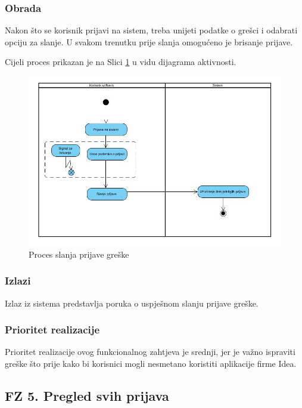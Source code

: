 \documentclass[12pt,a4paper]{article}
\begin{document}
\subsubsection{Obrada}

Nakon što se korisnik prijavi na sistem, treba unijeti podatke o grešci i odabrati opciju za slanje. U svakom trenutku prije slanja omogućeno je brisanje prijave.

Cijeli proces prikazan je na Slici \ref{act4} u vidu dijagrama aktivnosti.

\begin{figure}[H]
\center
\includegraphics[scale=0.5]{../res/Activity/activity4.JPG}
\caption{Proces slanja prijave greške}
\label{act4}
\end{figure}

\subsubsection{Izlazi}

Izlaz iz sistema predstavlja poruka o uspješnom slanju prijave greške.

\subsubsection{Prioritet realizacije}

Prioritet realizacije ovog funkcionalnog zahtjeva je srednji, jer je važno ispraviti greške što prije kako bi korisnici mogli nesmetano koristiti aplikacije firme Idea.

\newpage

\subsection{FZ 5. Pregled svih prijava}
\end{document}
